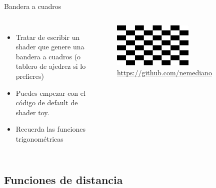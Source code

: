 \begin{frame}{Bandera a cuadros}
    \begin{columns}
     \begin{itemize}
         \item Tratar de escribir un shader que genere una bandera a cuadros (o tablero de ajedrez si lo prefieres)
         \item Puedes empezar con el código de default de shader toy.
         \item Recuerda las funciones trigonométricas
     \end{itemize}
        \begin{figure}[htb]
            \centering
            \includegraphics[width=0.6\textwidth]{img/Ejer1}
            \caption{\url{https://github.com/nemediano}}
        \end{figure}
\end{columns}
\end{frame}


\subsection{Funciones de distancia}

